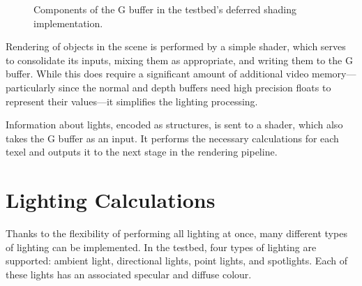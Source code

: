 \documentclass[11pt, oneside]{report}
\begin{document}
\begin{figure}[!htbp]
  \centering
  \hfill
  \hfill
  \caption{Components of the G buffer in the testbed's deferred shading implementation.}
\end{figure}

Rendering of objects in the scene is performed by a simple \gls{shader}, which serves to consolidate its inputs, mixing them as appropriate, and writing them to the G buffer. While this does require a significant amount of additional video memory---particularly since the normal and depth buffers need high precision \glspl{float} to represent their values---it simplifies the lighting processing.

Information about lights, encoded as structures, is sent to a shader, which also takes the G buffer as an input. It performs the necessary calculations for each \gls{texel} and outputs it to the next stage in the rendering pipeline.

\section{Lighting Calculations}
Thanks to the flexibility of performing all lighting at once, many different types of lighting can be implemented. In the testbed, four types of lighting are supported: ambient light, directional lights, point lights, and spotlights. Each of these lights has an associated \gls{specular} and \gls{diffuse} colour.
\end{document}
